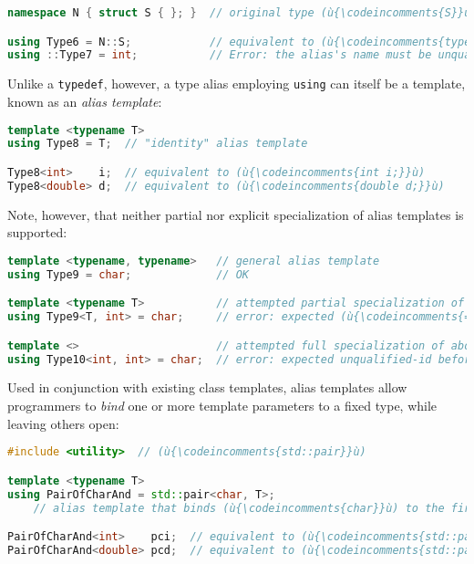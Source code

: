 \begin{lstlisting}[language=C++]
namespace N { struct S { }; }  // original type (ù{\codeincomments{S}}ù) defined with namespace (ù{\codeincomments{N}}ù)

using Type6 = N::S;            // equivalent to (ù{\codeincomments{typedef N::S Type6;}}ù)
using ::Type7 = int;           // Error: the alias's name must be unqualified.
\end{lstlisting}
    
\noindent Unlike a \texttt{typedef}, however, a type alias employing
\texttt{using} can itself be a template, known as an \emph{alias
template}:

\begin{lstlisting}[language=C++]
template <typename T>
using Type8 = T;  // "identity" alias template

Type8<int>    i;  // equivalent to (ù{\codeincomments{int i;}}ù)
Type8<double> d;  // equivalent to (ù{\codeincomments{double d;}}ù)
\end{lstlisting}
    
\noindent Note, however, that neither partial nor explicit specialization of alias
templates is supported:

\begin{lstlisting}[language=C++]
template <typename, typename>   // general alias template
using Type9 = char;             // OK

template <typename T>           // attempted partial specialization of above
using Type9<T, int> = char;     // error: expected (ù{\codeincomments{=}}ù) before (ù{\codeincomments{<}}ù) token

template <>                     // attempted full specialization of above
using Type10<int, int> = char;  // error: expected unqualified-id before (ù{\codeincomments{using}}ù)
\end{lstlisting}
    
\noindent Used in conjunction with existing class templates, alias templates allow
programmers to \emph{bind} one or more template parameters to a fixed
type, while leaving others open:

\begin{lstlisting}[language=C++]
#include <utility>  // (ù{\codeincomments{std::pair}}ù)

template <typename T>
using PairOfCharAnd = std::pair<char, T>;
    // alias template that binds (ù{\codeincomments{char}}ù) to the first type parameter of (ù{\codeincomments{std::pair}}ù)

PairOfCharAnd<int>    pci;  // equivalent to (ù{\codeincomments{std::pair<char, int> pci;}}ù)
PairOfCharAnd<double> pcd;  // equivalent to (ù{\codeincomments{std::pair<char, double> pcd;}}ù)
\end{lstlisting}
    
